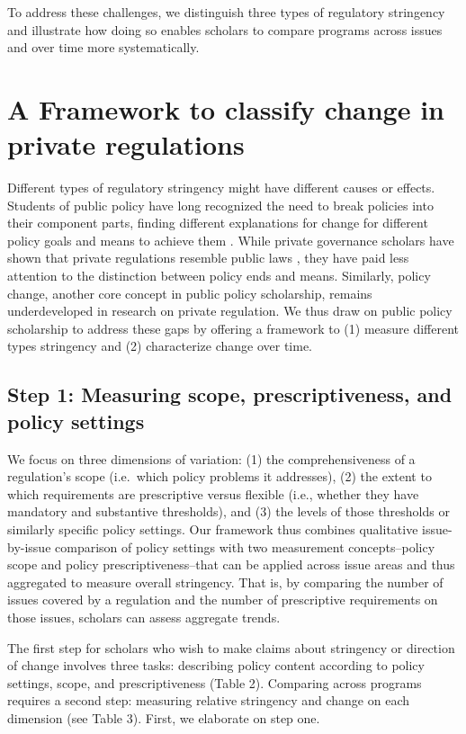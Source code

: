 \documentclass[
      12pt,
            Review ]{article}
\begin{document}
To address these challenges, we distinguish three types of regulatory
stringency and illustrate how doing so enables scholars to compare
programs across issues and over time more systematically.

\section{A Framework to classify change in private
regulations}\label{a-framework-to-classify-change-in-private-regulations}

Different types of regulatory stringency might have different causes or
effects. Students of public policy have long recognized the need to
break policies into their component parts, finding different
explanations for change for different policy goals and means to achieve
them \citep{Cashore1997, Hall1993, Weimer2017}. While private governance
scholars have shown that private regulations resemble public laws
\citep[\citet{Meidinger2006}]{Meidinger2003}, they have paid less
attention to the distinction between policy ends and means. Similarly,
policy change, another core concept in public policy scholarship,
remains underdeveloped in research on private regulation. We thus draw
on public policy scholarship to address these gaps by offering a
framework to (1) measure different types stringency and (2) characterize
change over time.

\subsection{Step 1: Measuring scope, prescriptiveness, and policy
settings}\label{step-1-measuring-scope-prescriptiveness-and-policy-settings}

We focus on three dimensions of variation: (1) the comprehensiveness of
a regulation's scope (i.e.~which policy problems it addresses), (2) the
extent to which requirements are prescriptive versus flexible (i.e.,
whether they have mandatory and substantive thresholds), and (3) the
levels of those thresholds or similarly specific policy settings. Our
framework thus combines qualitative issue-by-issue comparison of policy
settings with two measurement concepts--policy scope and policy
prescriptiveness--that can be applied across issue areas and thus
aggregated to measure overall stringency. That is, by comparing the
number of issues covered by a regulation and the number of prescriptive
requirements on those issues, scholars can assess aggregate trends.

The first step for scholars who wish to make claims about stringency or
direction of change involves three tasks: describing policy content
according to policy settings, scope, and prescriptiveness (Table 2).
Comparing across programs requires a second step: measuring relative
stringency and change on each dimension (see Table 3). First, we
elaborate on step one.
\end{document}
